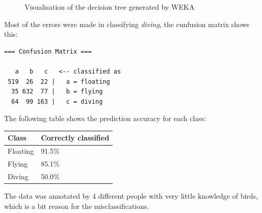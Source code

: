 \begin{figure}
\begin{center}
  \caption{Visualisation of the decision tree generated by WEKA}
  \label{fig:tree}
\end{center}
\end{figure}

Most of the errors were made in classifying \emph{diving}, the cunfusion matrix shows this:
\begin{verbatim}
=== Confusion Matrix ===

   a   b   c   <-- classified as
 519  26  22 |   a = floating
  35 632  77 |   b = flying
  64  99 163 |   c = diving
\end{verbatim}
The following table shows the prediction accuracy for each class:
\begin{center}
\begin{tabular}{l|l}
	\textnormal{Class} & \textnormal{Correctly classified} \\ \hline 
	Floating & 91.5\% \\
	Flying &  85.1\% \\
	Diving & 50.0\% \\
\end{tabular}
\end{center}

The data was annotated by 4 different people with very little knowledge of birds, which is a bit reason for the misclassifications. 
